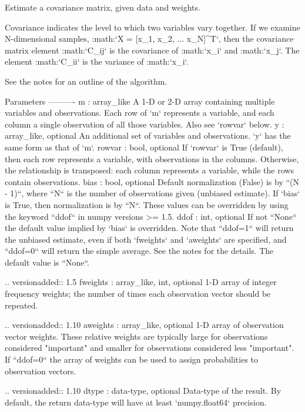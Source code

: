 \begin{DoxyVerb}Estimate a covariance matrix, given data and weights.

Covariance indicates the level to which two variables vary together.
If we examine N-dimensional samples, :math:`X = [x_1, x_2, ... x_N]^T`,
then the covariance matrix element :math:`C_{ij}` is the covariance of
:math:`x_i` and :math:`x_j`. The element :math:`C_{ii}` is the variance
of :math:`x_i`.

See the notes for an outline of the algorithm.

Parameters
----------
m : array_like
    A 1-D or 2-D array containing multiple variables and observations.
    Each row of `m` represents a variable, and each column a single
    observation of all those variables. Also see `rowvar` below.
y : array_like, optional
    An additional set of variables and observations. `y` has the same form
    as that of `m`.
rowvar : bool, optional
    If `rowvar` is True (default), then each row represents a
    variable, with observations in the columns. Otherwise, the relationship
    is transposed: each column represents a variable, while the rows
    contain observations.
bias : bool, optional
    Default normalization (False) is by ``(N - 1)``, where ``N`` is the
    number of observations given (unbiased estimate). If `bias` is True,
    then normalization is by ``N``. These values can be overridden by using
    the keyword ``ddof`` in numpy versions >= 1.5.
ddof : int, optional
    If not ``None`` the default value implied by `bias` is overridden.
    Note that ``ddof=1`` will return the unbiased estimate, even if both
    `fweights` and `aweights` are specified, and ``ddof=0`` will return
    the simple average. See the notes for the details. The default value
    is ``None``.

    .. versionadded:: 1.5
fweights : array_like, int, optional
    1-D array of integer frequency weights; the number of times each
    observation vector should be repeated.

    .. versionadded:: 1.10
aweights : array_like, optional
    1-D array of observation vector weights. These relative weights are
    typically large for observations considered "important" and smaller for
    observations considered less "important". If ``ddof=0`` the array of
    weights can be used to assign probabilities to observation vectors.

    .. versionadded:: 1.10
dtype : data-type, optional
    Data-type of the result. By default, the return data-type will have
    at least `numpy.float64` precision.


\end{DoxyVerb}

